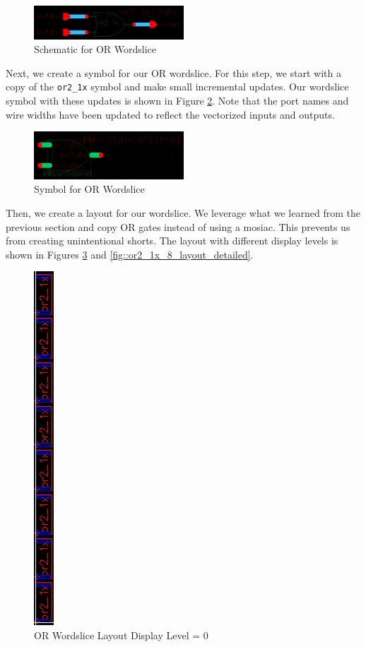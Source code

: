 \documentclass{article}
\begin{document}
	\begin{figure}[H]
		\centerline{\includegraphics[width=0.5\textwidth]{or2_1x_8_schematic.png}}
		\caption{Schematic for OR Wordslice}
		\label{fig::or2_1x_8_schematic}
	\end{figure}
	
	\noindent Next, we create a symbol for our OR wordslice. For this step, we start with a copy of the \texttt{or2\_1x} symbol and make small incremental updates. Our wordslice symbol with these updates is shown in Figure \ref{fig::or2_1x_8_symbol}. Note that the port names and wire widths have been updated to reflect the vectorized inputs and outputs.
	
	\begin{figure}[H]
		\centerline{\includegraphics[width=0.5\textwidth]{or2_1x_8_symbol.png}}
		\caption{Symbol for OR Wordslice}
		\label{fig::or2_1x_8_symbol}
	\end{figure}
	
	\noindent Then, we create a layout for our wordslice. We leverage what we learned from the previous section and copy OR gates instead of using a mosiac. This prevents us from creating unintentional shorts. The layout with different display levels is shown in Figures \ref{fig::or2_1x_8_layout_overview} and \ref{fig::or2_1x_8_layout_detailed}.
	
	\begin{figure}[H]
		\centerline{\includegraphics[height=0.8\textwidth, angle=270]{or2_1x_8_layout_overview.png}}
		\caption{OR Wordslice Layout Display Level = 0}
		\label{fig::or2_1x_8_layout_overview}
	\end{figure}
	
\end{document}
